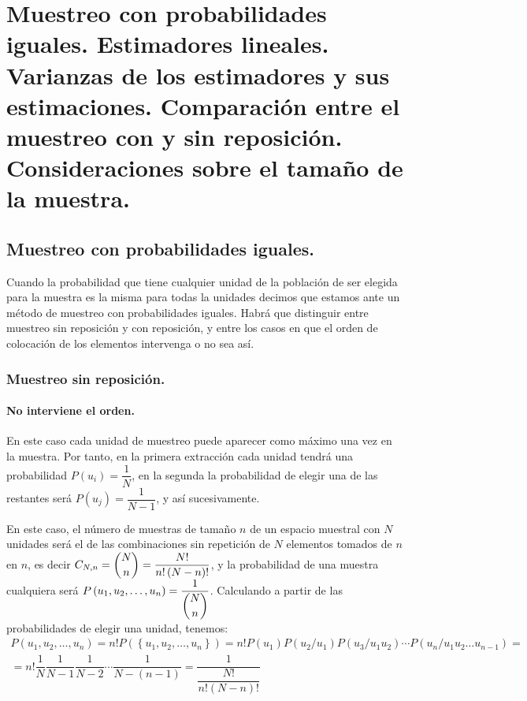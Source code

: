 %

\chapter{Muestreo con probabilidades iguales. Estimadores lineales. Varianzas
de los estimadores y sus estimaciones. Comparaci\'on entre el muestreo
con y sin reposici\'on. Consideraciones sobre el tama\~no de la muestra.}


\section{Muestreo con probabilidades iguales.}

Cuando la probabilidad que tiene cualquier unidad de la poblaci\'on
de ser elegida para la muestra es la misma para todas la unidades
decimos que estamos ante un m\'etodo de muestreo con probabilidades
iguales. Habr\'a que distinguir entre muestreo sin reposici\'on y con
reposici\'on, y entre los casos en que el orden de colocaci\'on de los
elementos intervenga o no sea as\'i.


\subsection{Muestreo sin reposici\'on.}


\subsubsection{No interviene el orden.}

En este caso cada unidad de muestreo puede aparecer como m\'aximo una
vez en la muestra. Por tanto, en la primera extracci\'on cada unidad
tendr\'a una probabilidad $P\left(u_{i}\right)=\dfrac{1}{N}$, en la
segunda la probabilidad de elegir una de las restantes ser\'a $P\left(u_{j}\right)=\dfrac{1}{N-1}$,
y as\'i sucesivamente.

En este caso, el n\'umero de muestras de tama\~no $n$ de un espacio muestral
con $N$ unidades ser\'a el de las combinaciones sin repetici\'on de $N$
elementos tomados de $n$ en $n$, es decir $C_{N,n}=\dbinom{N}{n}=\dfrac{N!}{n!\left(N-n\right)!}$,
y la probabilidad de una muestra cualquiera ser\'a $P\left(u_{1},u_{2},\ldots,u_{n}\right)=\dfrac{1}{\dbinom{N}{n}}$.
Calculando a partir de las probabilidades de elegir una unidad, tenemos:
\[
\begin{array}{c}
P\left(u_{1},u_{2},\ldots,u_{n}\right)=n!P\left(\left\{ u_{1},u_{2},\ldots,u_{n}\right\} \right)=n!P\left(u_{1}\right)P\left(u_{2}/u_{1}\right)P\left(u_{3}/u_{1}u_{2}\right)\cdots P\left(u_{n}/u_{1}u_{2}\ldots u_{n-1}\right)=\\
=n!\dfrac{1}{N}\dfrac{1}{N-1}\dfrac{1}{N-2}\cdots\dfrac{1}{N-\left(n-1\right)}=\dfrac{1}{\dfrac{N!}{n!\left(N-n\right)!}}
\end{array}
\]


